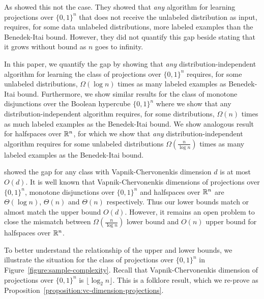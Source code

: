 As \citet{Darnstadt-Simon-Szorenyi-2013} showed this not the case. They showed
that \emph{any} algorithm for learning projections over $\{0,1\}^n$ that does
not receive the unlabeled distribution as input, requires, for some data
unlabeled distributions, more labeled examples than the Benedek-Itai bound.
However, they did not quantify this gap beside stating that it grows without
bound as $n$ goes to infinity.

In this paper, we quantify the gap by showing that \emph{any}
distribution-independent algorithm for learning the class of projections over
$\{0,1\}^n$ requires, for some unlabeled distributions, $\Omega(\log n)$ times
as many labeled examples as Benedek-Itai bound. Furthermore, we show similar
results for the class of monotone disjunctions over the Boolean hypercube
$\{0,1\}^n$ where we show that any distribution-independent algorithm requires,
for some distributions, $\Omega(n)$ times as much labeled examples as the
Benedek-Itai bound. We show analogous result for halfspaces over $\mathbb{R}^n$, for
which we show that \emph{any} distribution-independent algorithm requires for
some unlabeled distributions $\Omega(\frac{n}{\log n})$ times as many labeled
examples as the Benedek-Itai bound.

\citet{Darnstadt-Simon-Szorenyi-2013} showed the gap for any class with
Vapnik-Chervonenkis dimension $d$ is at most $O(d)$. It is well known that
Vapnik-Chervonenkis dimensions of projections over $\{0,1\}^n$, monotone
disjunctions over $\{0,1\}^n$ and halfspaces over $\mathbb{R}^n$ are $\Theta(\log n)$,
$\Theta(n)$ and $\Theta(n)$ respectively. Thus our lower bounds match or almost
match the upper bound $O(d)$. However, it remains an open problem to close the
mismatch between $\Omega(\frac{n}{\log n})$ lower bound and $O(n)$ upper bound
for halfspaces over $\mathbb{R}^n$.

To better understand the relationship of the upper and lower bounds, we
illustrate the situation for the class of projections over $\{0,1\}^n$ in
Figure~\ref{figure:sample-complexity}. Recall that Vapnik-Chervonenkis dimension
of projections over $\{0,1\}^n$ is $\lfloor \log_2 n \rfloor$. This is a
folklore result, which we re-prove as
Proposition~\ref{proposition:vc-dimension-projections}.

